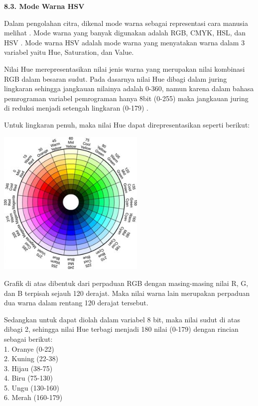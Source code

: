 \documentclass[a4paper,12pt]{article}
\begin{document}
\indent \textbf{8.3. \hspace{8pt} Mode Warna HSV}

Dalam pengolahan citra, dikenal mode warna sebagai representasi cara manusia melihat \cite{robot} . 
Mode warna yang banyak digunakan adalah RGB, CMYK, HSL, dan HSV \cite{improc1}. 
Mode warna HSV adalah mode warna yang menyatakan warna dalam 3 variabel yaitu Hue, Saturation, dan Value.

Nilai Hue merepresentasikan nilai jenis warna yang merupakan nilai kombinasi RGB dalam besaran sudut. 
Pada dasarnya nilai Hue dibagi dalam juring lingkaran sehingga jangkauan nilainya adalah 0-360, namun karena dalam bahasa pemrograman variabel pemrograman hanya 8bit (0-255) maka jangkauan juring di reduksi menjadi setengah lingkaran (0-179) \cite{opencv_intro}.

Untuk lingkaran penuh, maka nilai Hue dapat direpresentasikan seperti berikut:
\begin{center}
 \includegraphics[width=200pt]{HSV}
\end{center}

Grafik di atas dibentuk dari perpaduan RGB dengan masing-masing nilai R, G, dan B terpisah sejauh 120 derajat.
Maka nilai warna lain merupakan perpaduan dua warna dalam rentang 120 derajat tersebut.

Sedangkan untuk dapat diolah dalam variabel 8 bit, maka nilai sudut di atas dibagi 2, sehingga nilai Hue terbagi menjadi 180 nilai (0-179) dengan rincian sebagai berikut:\\
1. Oranye (0-22)\\
2. Kuning (22-38)\\
3. Hijau (38-75)\\
4. Biru (75-130)\\
5. Ungu (130-160)\\
6. Merah (160-179)
\end{document}
